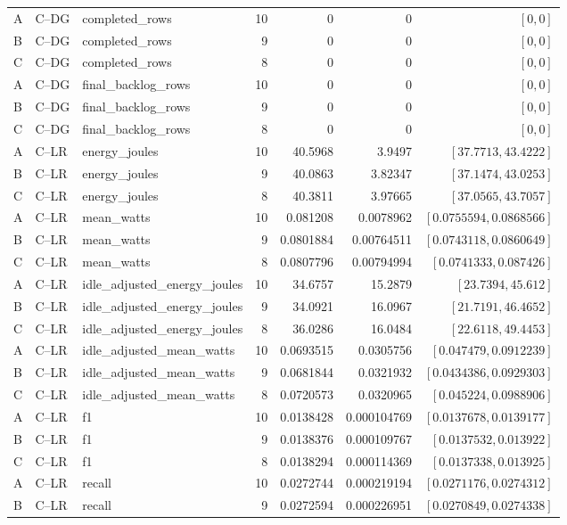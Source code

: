 \begin{longtable}{lllrrrr}
A & C--DG & completed\_rows & 10 & 0 & 0 & $[0,0]$\\
B & C--DG & completed\_rows & 9 & 0 & 0 & $[0,0]$\\
C & C--DG & completed\_rows & 8 & 0 & 0 & $[0,0]$\\
A & C--DG & final\_backlog\_rows & 10 & 0 & 0 & $[0,0]$\\
B & C--DG & final\_backlog\_rows & 9 & 0 & 0 & $[0,0]$\\
C & C--DG & final\_backlog\_rows & 8 & 0 & 0 & $[0,0]$\\
A & C--LR & energy\_joules & 10 & 40.5968 & 3.9497 & $[37.7713,43.4222]$\\
B & C--LR & energy\_joules & 9 & 40.0863 & 3.82347 & $[37.1474,43.0253]$\\
C & C--LR & energy\_joules & 8 & 40.3811 & 3.97665 & $[37.0565,43.7057]$\\
A & C--LR & mean\_watts & 10 & 0.081208 & 0.0078962 & $[0.0755594,0.0868566]$\\
B & C--LR & mean\_watts & 9 & 0.0801884 & 0.00764511 & $[0.0743118,0.0860649]$\\
C & C--LR & mean\_watts & 8 & 0.0807796 & 0.00794994 & $[0.0741333,0.087426]$\\
A & C--LR & idle\_adjusted\_energy\_joules & 10 & 34.6757 & 15.2879 & $[23.7394,45.612]$\\
B & C--LR & idle\_adjusted\_energy\_joules & 9 & 34.0921 & 16.0967 & $[21.7191,46.4652]$\\
C & C--LR & idle\_adjusted\_energy\_joules & 8 & 36.0286 & 16.0484 & $[22.6118,49.4453]$\\
A & C--LR & idle\_adjusted\_mean\_watts & 10 & 0.0693515 & 0.0305756 & $[0.047479,0.0912239]$\\
B & C--LR & idle\_adjusted\_mean\_watts & 9 & 0.0681844 & 0.0321932 & $[0.0434386,0.0929303]$\\
C & C--LR & idle\_adjusted\_mean\_watts & 8 & 0.0720573 & 0.0320965 & $[0.045224,0.0988906]$\\
A & C--LR & f1 & 10 & 0.0138428 & 0.000104769 & $[0.0137678,0.0139177]$\\
B & C--LR & f1 & 9 & 0.0138376 & 0.000109767 & $[0.0137532,0.013922]$\\
C & C--LR & f1 & 8 & 0.0138294 & 0.000114369 & $[0.0137338,0.013925]$\\
A & C--LR & recall & 10 & 0.0272744 & 0.000219194 & $[0.0271176,0.0274312]$\\
B & C--LR & recall & 9 & 0.0272594 & 0.000226951 & $[0.0270849,0.0274338]$\\

\end{longtable}
